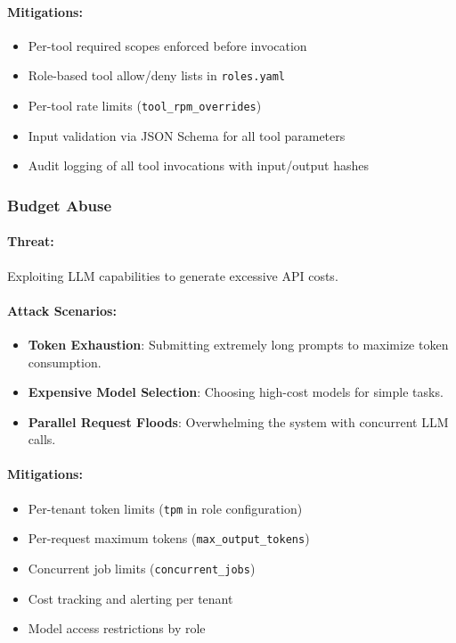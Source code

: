 \paragraph{Mitigations:}
\begin{itemize}
    \item Per-tool required scopes enforced before invocation
    \item Role-based tool allow/deny lists in \texttt{roles.yaml}
    \item Per-tool rate limits (\texttt{tool\_rpm\_overrides})
    \item Input validation via JSON Schema for all tool parameters
    \item Audit logging of all tool invocations with input/output hashes
\end{itemize}

\subsubsection{Budget Abuse}

\paragraph{Threat:} Exploiting LLM capabilities to generate excessive API costs.

\paragraph{Attack Scenarios:}
\begin{itemize}
    \item \textbf{Token Exhaustion}: Submitting extremely long prompts to maximize token consumption.
    \item \textbf{Expensive Model Selection}: Choosing high-cost models for simple tasks.
    \item \textbf{Parallel Request Floods}: Overwhelming the system with concurrent LLM calls.
\end{itemize}

\paragraph{Mitigations:}
\begin{itemize}
    \item Per-tenant token limits (\texttt{tpm} in role configuration)
    \item Per-request maximum tokens (\texttt{max\_output\_tokens})
    \item Concurrent job limits (\texttt{concurrent\_jobs})
    \item Cost tracking and alerting per tenant
    \item Model access restrictions by role
\end{itemize}

